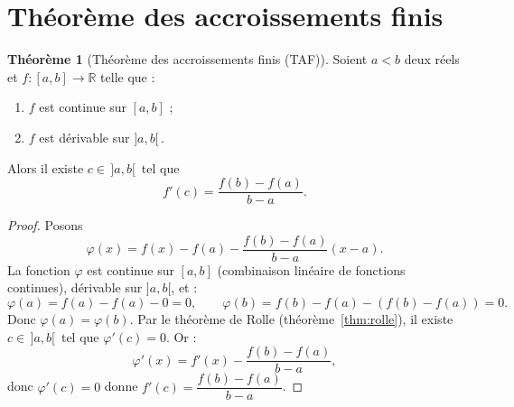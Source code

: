 \documentclass[12pt,a4paper,openany]{book}
\theoremstyle{definition}
\newtheorem{theoreme}{Théorème}[chapter]
\newcommand{\R}{\mathbb{R}}
\begin{document}
\section{Théorème des accroissements finis}\label{sec:TAF}

\begin{theoreme}[Théorème des accroissements finis (TAF)]\label{thm:TAF}
Soient $a < b$ deux réels et $f \colon [a, b] \to \R$ telle que :
\begin{enumerate}[label=\textup{(\roman*)}]
  \item $f$ est continue sur $[a, b]$ ;
  \item $f$ est dérivable sur $]a, b[\,$.
\end{enumerate}
Alors il existe $c \in \,]a, b[\,$ tel que
\[
  f'(c) = \frac{f(b) - f(a)}{b - a}.
\]
\end{theoreme}

\begin{proof}
Posons
\[
  \varphi(x) = f(x) - f(a) - \frac{f(b) - f(a)}{b - a}(x - a).
\]
La fonction $\varphi$ est continue sur $[a, b]$ (combinaison linéaire de fonctions continues), dérivable sur $]a, b[$, et :
\[
  \varphi(a) = f(a) - f(a) - 0 = 0, \qquad
  \varphi(b) = f(b) - f(a) - (f(b) - f(a)) = 0.
\]
Donc $\varphi(a) = \varphi(b)$. Par le théorème de Rolle (théorème~\ref{thm:rolle}), il existe $c \in \,]a, b[\,$ tel que $\varphi'(c) = 0$. Or :
\[
  \varphi'(x) = f'(x) - \frac{f(b) - f(a)}{b - a},
\]
donc $\varphi'(c) = 0$ donne $f'(c) = \dfrac{f(b) - f(a)}{b - a}$.
\end{proof}
\end{document}
